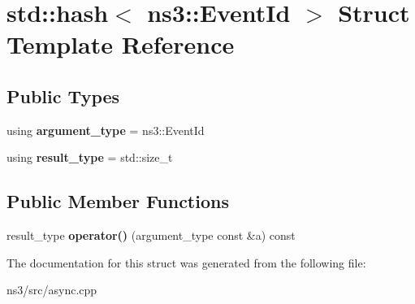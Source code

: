 \hypertarget{structstd_1_1hash_3_01ns3_1_1EventId_01_4}{\section{std\-:\-:hash$<$ ns3\-:\-:Event\-Id $>$ Struct Template Reference}
\label{structstd_1_1hash_3_01ns3_1_1EventId_01_4}
}
\subsection*{Public Types}
\begin{DoxyCompactItemize}
\item 
\hypertarget{structstd_1_1hash_3_01ns3_1_1EventId_01_4_a2c48c6c1f4ea8b1710f858c53c4e1b98}{using {\bfseries argument\-\_\-type} = ns3\-::\-Event\-Id}\label{structstd_1_1hash_3_01ns3_1_1EventId_01_4_a2c48c6c1f4ea8b1710f858c53c4e1b98}

\item 
\hypertarget{structstd_1_1hash_3_01ns3_1_1EventId_01_4_a471ca48ea3bae2a14521817255409f95}{using {\bfseries result\-\_\-type} = std\-::size\-\_\-t}\label{structstd_1_1hash_3_01ns3_1_1EventId_01_4_a471ca48ea3bae2a14521817255409f95}

\end{DoxyCompactItemize}
\subsection*{Public Member Functions}
\begin{DoxyCompactItemize}
\item 
\hypertarget{structstd_1_1hash_3_01ns3_1_1EventId_01_4_a031f6a21ea07a32477fe42ca6b2c7244}{result\-\_\-type {\bfseries operator()} (argument\-\_\-type const \&a) const }\label{structstd_1_1hash_3_01ns3_1_1EventId_01_4_a031f6a21ea07a32477fe42ca6b2c7244}

\end{DoxyCompactItemize}


The documentation for this struct was generated from the following file\-:\begin{DoxyCompactItemize}
\item 
ns3/src/async.\-cpp\end{DoxyCompactItemize}
